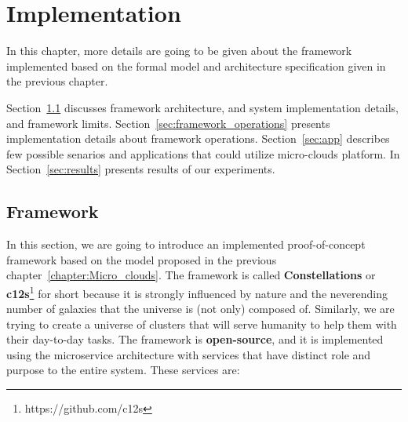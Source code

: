 \chapter{Implementation}\label{chapter:Implementation}
%
In this chapter, more details are going to be given about the framework implemented based on the formal model and architecture specification given in the previous chapter.

Section~\ref{sec:framework} discusses framework architecture, and system implementation details, and framework limits. Section~\ref{sec:framework_operations} presents implementation details about framework operations. Section~\ref{sec:app} describes few possible senarios and applications that could utilize micro-clouds platform. In Section~\ref{sec:results} presents results of our experiments.
%
%
\section{Framework}\label{sec:framework}
%
In this section, we are going to introduce an implemented proof-of-concept framework based on the model proposed in the previous chapter~\ref{chapter:Micro_clouds}. The framework is called \textbf{Constellations} or \textbf{c12s}\footnote{https://github.com/c12s} for short because it is strongly influenced by nature and the neverending number of galaxies that the universe is (not only) composed of. Similarly, we are trying to create a universe of clusters that will serve humanity to help them with their day-to-day tasks. The framework is \textbf{open-source}, and it is implemented using the microservice architecture with services that have distinct role and purpose to the entire system. These services are:

